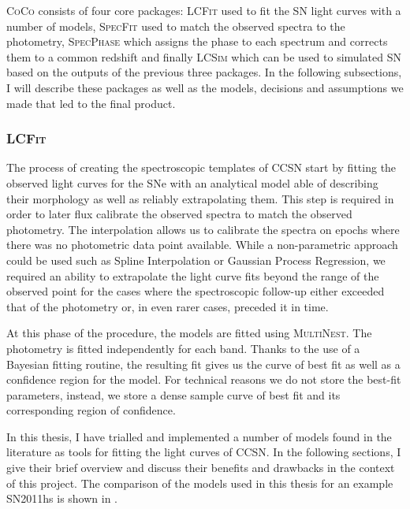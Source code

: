 \textsc{CoCo} consists of four core packages: \textsc{LCFit} used to fit the SN light curves with a number of models, \textsc{SpecFit} used to match the observed spectra to the photometry, \textsc{SpecPhase} which assigns the phase to each spectrum and corrects them to a common redshift and finally \textsc{LCSim} which can be used to simulated SN based on the outputs of the previous three packages. In the following subsections, I will describe these packages as well as the models, decisions and assumptions we made that led to the final product.

\subsubsection{\textsc{LCFit}} \label{sec:LCFit}
The process of creating the spectroscopic templates of CCSN start by fitting the observed light curves for the SNe with an analytical model able of describing their morphology as well as reliably extrapolating them. This step is required in order to later flux calibrate the observed spectra to match the observed photometry. The interpolation allows us to calibrate the spectra on epochs where there was no photometric data point available. While a non-parametric approach could be used such as Spline Interpolation or Gaussian Process Regression, we required an ability to extrapolate the light curve fits beyond the range of the observed point for the cases where the spectroscopic follow-up either exceeded that of the photometry or, in even rarer cases, preceded it in time.

At this phase of the procedure, the models are fitted using \textsc{MultiNest}. The photometry is fitted independently for each band. Thanks to the use of a Bayesian fitting routine, the resulting fit gives us the curve of best fit as well as a confidence region for the model. For technical reasons we do not store the best-fit parameters, instead, we store a dense sample curve of best fit and its corresponding region of confidence.

In this thesis, I have trialled and implemented a number of models found in the literature as tools for fitting the light curves of CCSN. In the following sections, I give their brief overview and discuss their benefits and drawbacks in the context of this project. The comparison of the models used in this thesis for an example SN2011hs is shown in .

